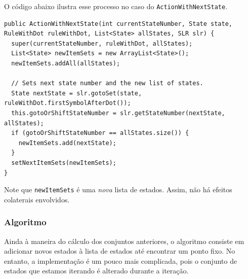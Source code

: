 \documentclass[11pt]{article}
\begin{document}
O código abaixo ilustra esse processo no caso do \texttt{ActionWithNextState}.

\begin{verbatim}
public ActionWithNextState(int currentStateNumber, State state, RuleWithDot ruleWithDot, List<State> allStates, SLR slr) {
  super(currentStateNumber, ruleWithDot, allStates);
  List<State> newItemSets = new ArrayList<State>();
  newItemSets.addAll(allStates);

  // Sets next state number and the new list of states.
  State nextState = slr.gotoSet(state, ruleWithDot.firstSymbolAfterDot());
  this.gotoOrShiftStateNumber = slr.getStateNumber(nextState, allStates);
  if (gotoOrShiftStateNumber == allStates.size()) {
    newItemSets.add(nextState);
  }
  setNextItemSets(newItemSets);
}
\end{verbatim}

Note que \texttt{newItemSets} é uma \emph{nova} lista de estados. Assim, não há efeitos
colaterais envolvidos.

\subsubsection{Algoritmo}
\label{sec:orgheadline12}
Ainda à maneira do cálculo dos conjuntos anteriores, o algoritmo consiste em adicionar
novos estados à lista de estados até encontrar um ponto fixo. No entanto, a
implementação é um pouco mais complicada, pois o conjunto de estados que estamos
iterando é alterado durante a iteração.
\end{document}
